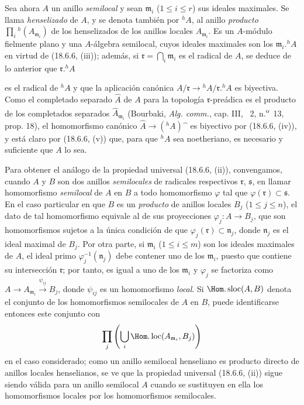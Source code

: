 \begin{env}[18.6.7]
\label{IV.18.6.7}
Sea ahora $A$ un anillo \emph{semilocal} y sean $\mathfrak m_i$ ($1\leq i\leq r$) sus ideales maximales. Se llama \emph{henselizado} de $A$, y se denota también por ${}^h\!A$, al anillo \emph{producto} $\prod_i{}^h(A_{\mathfrak m_i})$ de los henselizados de los anillos locales $A_{\mathfrak m_i}$. Es un $A$-módulo fielmente plano y una $A$-álgebra semilocal, cuyos ideales maximales son los $\mathfrak m_i.{}^h\!A$ en virtud de (18.6.6, (iii)); además, si $\mathfrak r=\bigcap_i\mathfrak m_i$ es el radical de $A$, se deduce de lo anterior que $\mathfrak r.{}^h\!A$


es el radical de ${}^h\!A$ y que la aplicación canónica $A/\mathfrak r\to{}^h\!A/\mathfrak r.{}^h\!A$ es biyectiva. Como el completado separado $\widehat A$ de $A$ para la topología $\mathfrak r$-preádica es el producto de los completados separados $\widehat A_{\mathfrak m_i}$ (Bourbaki, \emph{Alg. comm.}, cap. III, \textsection~2, n.\textsuperscript{o}~13, prop. 18), el homomorfismo canónico $\widehat A\to({}^h\!A)\widehat{\phantom{x}}$ es biyectivo por (18.6.6, (iv)), y está claro por (18.6.6, (v)) que, para que ${}^h\!A$ sea noetheriano, es necesario y suficiente que $A$ lo sea.

Para obtener el análogo de la propiedad universal (18.6.6, (ii)), convengamos, cuando $A$ y $B$ son dos anillos \emph{semilocales} de radicales respectivos $\mathfrak r$, $\mathfrak s$, en llamar homomorfismo \emph{semilocal} de $A$ en $B$ a todo homomorfismo $\varphi$ tal que $\varphi(\mathfrak r)\subset\mathfrak s$. En el caso particular en que $B$ es un \emph{producto} de anillos locales $B_j$ ($1\leq j\leq n$), el dato de tal homomorfismo equivale al de sus proyecciones $\varphi_j:A\to B_j$, que son homomorfismos sujetos a la única condición de que $\varphi_j(\mathfrak r)\subset\mathfrak n_j$, donde $\mathfrak n_j$ es el ideal maximal de $B_j$. Por otra parte, si $\mathfrak m_i$ ($1\leq i\leq m$) son los ideales maximales de $A$, el ideal primo $\varphi_j^{-1}(\mathfrak n_j)$ debe contener uno de los $\mathfrak m_i$, puesto que contiene su intersección $\mathfrak r$; por tanto, es igual a uno de los $\mathfrak m_i$ y $\varphi_j$ se factoriza como $A\to A_{\mathfrak m_i}\xrightarrow{\psi_{ij}}B_j$, donde $\psi_{ij}$ es un homomorfismo \emph{local}. Si $\Hom.\operatorname{sloc}(A,B)$ denota el conjunto de los homomorfismos semilocales de $A$ en $B$, puede identificarse entonces este conjunto con
\[
  \prod_j\left(\bigcup_i\Hom.\operatorname{loc}(A_{\mathfrak m_i},B_j)\right)
\]
en el caso considerado; como un anillo semilocal henseliano es producto directo de anillos locales henselianos, se ve que la propiedad universal (18.6.6, (ii)) sigue siendo válida para un anillo semilocal $A$ cuando se sustituyen en ella los homomorfismos locales por los homomorfismos semilocales.
\end{env}

